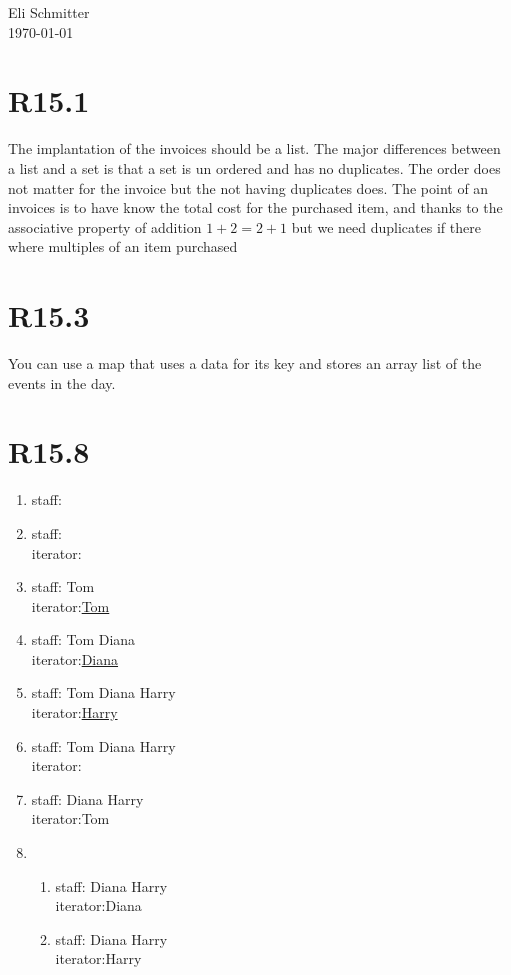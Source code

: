 \documentclass{article}
\begin{document}
\begin{flushleft}
 Eli Schmitter\\
 \today
\end{flushleft}
\section{R15.1}
The implantation of the invoices should be a list. The major differences between a list and a set is that a set is un ordered and has no duplicates. The order does not matter for the invoice but the not having duplicates does. The point of an invoices is to have know the total cost for the purchased item, and thanks to the associative property of addition $1+2=2+1$ but we need duplicates if there where multiples of an item purchased
\section{R15.3}
You can use a map that uses a data for its key and stores an array list of the events in the day.
\section{R15.8}
\begin{enumerate}
 \item staff:
 \item staff:\\
       iterator:
 \item staff: Tom\\
       iterator:\underline{Tom}
 \item staff: Tom Diana\\
       iterator:\underline{Diana}
 \item staff: Tom Diana Harry\\
       iterator:\underline{Harry}
 \item staff: Tom Diana Harry\\
       iterator:
 \item staff: Diana Harry\\
       iterator:{Tom}
 \item
       \begin{enumerate}
        \item staff: Diana Harry\\
        iterator:{Diana}
        \item staff: Diana Harry\\
        iterator:{Harry}
       \end{enumerate}
\end{enumerate}
\end{document}
